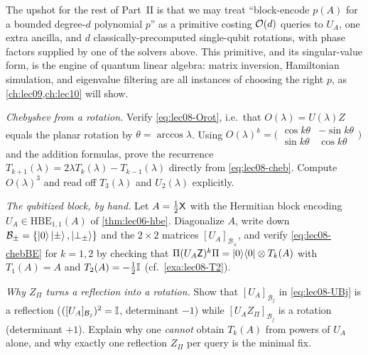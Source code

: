 The upshot for the rest of Part~II is that we may treat ``block-encode $p(A)$ for a
bounded degree-$d$ polynomial $p$'' as a primitive costing $\mathcal{O}(d)$ queries to
$U_A$, one extra ancilla, and $d$ classically-precomputed single-qubit rotations,
with phase factors supplied by one of the solvers above. This primitive, and its
singular-value form, is the engine of quantum linear algebra: matrix inversion,
Hamiltonian simulation, and eigenvalue filtering are all instances of choosing the
right $p$, as \cref{ch:lec09,ch:lec10} will show.

\exercisesection

\begin{exercise}\label{ex:lec08-1}
\emph{Chebyshev from a rotation.} Verify \eqref{eq:lec08-Orot}, i.e.\ that
$O(\lambda)=U(\lambda)Z$ equals the planar rotation by $\theta=\arccos\lambda$. Using
$O(\lambda)^k=\bigl(\begin{smallmatrix}\cos k\theta&-\sin k\theta\\ \sin k\theta&
\cos k\theta\end{smallmatrix}\bigr)$ and the addition formulas, prove the recurrence
$T_{k+1}(\lambda)=2\lambda T_k(\lambda)-T_{k-1}(\lambda)$ directly from
\eqref{eq:lec08-cheb}. Compute $O(\lambda)^3$ and read off $T_3(\lambda)$ and
$U_2(\lambda)$ explicitly.
\end{exercise}

\begin{exercise}\label{ex:lec08-2}
\emph{The qubitized block, by hand.} Let $A=\tfrac12\mathsf{X}$ with the Hermitian block
encoding $U_A\in\mathrm{HBE}_{1,1}(A)$ of \cref{thm:lec06-hbe}. Diagonalize $A$,
write down $\mathcal B_\pm=\{\ket0\ket\pm,\ket{\perp_\pm}\}$ and the $2\times2$
matrices $[U_A]_{\mathcal B_\pm}$, and verify \eqref{eq:lec08-chebBE} for $k=1,2$ by
checking that $\Pi(U_A\mathsf{Z})^k\Pi=\ket{0}\!\bra{0}\otimes T_k(A)$ with $T_1(A)=A$ and
$T_2(A)=-\tfrac12\mathbb{I}$ (cf.\ \cref{exa:lec08-T2}).
\end{exercise}

\begin{exercise}\label{ex:lec08-3}
\emph{Why $Z_\Pi$ turns a reflection into a rotation.} Show that
$[U_A]_{\mathcal B_j}$ in \eqref{eq:lec08-UBj} is a reflection ($([U_A]_{\mathcal B_j})^2
=\mathbb{I}$, determinant $-1$) while $[U_A Z_\Pi]_{\mathcal B_j}$ is a rotation
(determinant $+1$). Explain why one \emph{cannot} obtain $T_k(A)$ from powers of
$U_A$ alone, and why exactly one reflection $Z_\Pi$ per query is the minimal fix.
\end{exercise}

